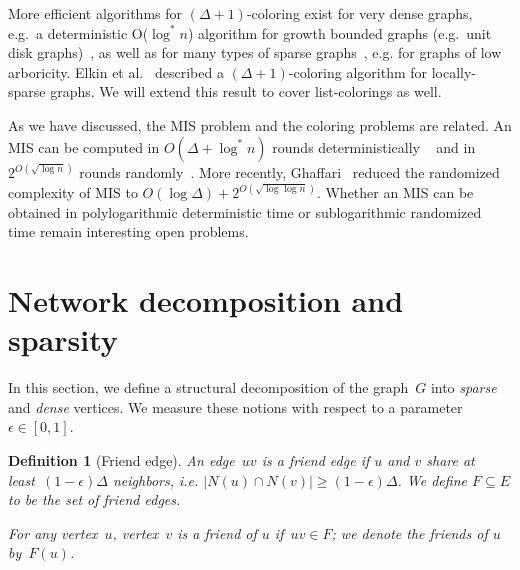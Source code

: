 \documentclass[11pt]{amsart}
\newtheorem{definition}[theorem]{Definition}
\begin{document}
More efficient algorithms for $(\Delta+1)$-coloring exist for very dense graphs, e.g.~a deterministic O($\log^* n$) algorithm for growth bounded graphs (e.g.~unit disk graphs)~\cite{sch10opt}, as well as for many types of sparse graphs~\cite{BEPS16,elk15,PS13}, e.g. for graphs of low arboricity. Elkin et al.~\cite{elk15} described a $(\Delta+1)$-coloring algorithm for locally-sparse graphs. We will extend this result to cover list-colorings as well.

As we have discussed, the MIS problem and the coloring problems are related. An MIS can be computed in $O(\Delta+\log^{*} n)$ rounds deterministically ~\cite{BEK09} and in $2^{O(\sqrt{\log n})}$ rounds randomly~\cite{panc92}. More recently, Ghaffari~\cite{Moh16} reduced the randomized complexity of MIS to $O(\log \Delta) + 2^{O(\sqrt{\log \log n})}$. Whether an MIS can be obtained in polylogarithmic deterministic time or sublogarithmic randomized time remain interesting open problems.

\iffalse
A generalization of MIS, known as an \emph{ruling set}, has also been considered. A ($\alpha,\beta$)-ruling set~$U \subseteq V$ is a set of vertices such that two nodes $u,u' \in U$ have distance at least~$\alpha$ and for any node~$v \in V\setminus U$ there exists a node~$u\in U$ with distance at most~$\beta$~\cite{awer89}.  MIS is a special case, namely a $(2,1)$-ruling set.  A number of papers~\cite{gfeller07,sch13,awer89} use ruling sets to compute colorings in different kinds of graphs. A ruling set can be viewed as defining a network decomposition, such that any component has diameter at least~$\alpha$ and at most~$2\beta$.
\fi

\section{Network decomposition and sparsity} \label{decomp-sec}
In this section, we define a structural decomposition of the graph~$G$ into \emph{sparse} and \emph{dense} vertices. We measure  these notions with respect to a parameter~$\epsilon \in [0,1]$.

\begin{definition}[Friend edge]
An edge~$uv$ is a \emph{friend} edge if $u$ and $v$ share at least~$(1-\epsilon)\Delta$ neighbors, i.e. $|N(u) \cap N(v)| \geq (1-\epsilon) \Delta$. We define $F \subseteq E$ to be the set of friend edges.

For any vertex~$u$, vertex~$v$ is a friend of $u$ if~$uv \in F$; we denote the friends of $u$ by~$F(u)$.
\end{definition}
\end{document}
